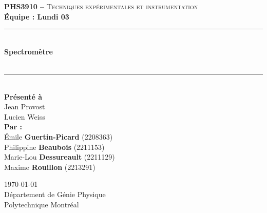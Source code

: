 \documentclass[11pt,letterpaper]{article}
\begin{document}
\begin{titlepage}
\center

\begin{figure}
\end{figure}
\vspace*{2 cm}

\textsc{\Large \textbf{PHS3910 --} Techniques expérimentales et instrumentation}\\[0.5cm]
\large{\textbf{Équipe : Lundi 03}}\\[1.5cm]

\rule{\linewidth}{0.5mm} \\[0.5cm]
\Large{\textbf{Spectromètre}} \\[0.2cm]
\\
\rule{\linewidth}{0.2mm} \\[2.3cm]

\large{\textbf{Présenté à}\\
  Jean Provost\\
  Lucien Weiss\\[2.5cm]
  \textbf{Par :}\\
  Émile \textbf{Guertin-Picard} (2208363)\\
  Philippine \textbf{Beaubois} (2211153)\\
  Marie-Lou \textbf{Dessureault} (2211129)\\
  Maxime \textbf{Rouillon} (2213291)\\[3cm]}

\large{\today\\
Département de Génie Physique\\
Polytechnique Montréal\\}

\end{titlepage}


\tableofcontents
{}
\newpage

\pagestyle{fancy}
\setlength{\headheight}{14pt}
\renewcommand{\headrulewidth}{0pt}
\fancyfoot[R]{\thepage}

\pagestyle{fancy}
\fancyhf{}
\renewcommand{\headrulewidth}{1pt}
\fancyhead[R]{\today}
\fancyfoot[R]{\thepage}

\setcounter{page}{1}

\end{document}
